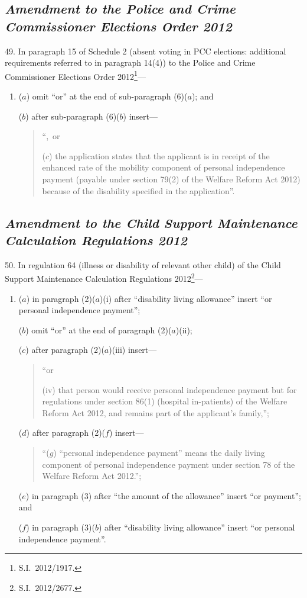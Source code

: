 \documentclass[12pt,a4paper]{article}
\begin{document}
\subsection*{\itshape Amendment to the Police and Crime Commissioner Elections Order 2012}

49.  In paragraph 15 of Schedule 2 (absent voting in PCC elections: additional requirements referred to in paragraph 14(4)) to the Police and Crime Commissioner Elections Order 2012\footnote{S.I.~2012/1917.}—
\begin{enumerate}\item[]
($a$) omit “or” at the end of sub-paragraph (6)($a$); and

($b$) after sub-paragraph (6)($b$)  insert—
\begin{quotation}
“,~or

($c$) the application states that the applicant is in receipt of the enhanced rate of the mobility component of personal independence payment (payable under section 79(2) of the Welfare Reform Act 2012) because of the disability specified in the application”.
\end{quotation}
\end{enumerate}

\subsection*{\itshape Amendment to the Child Support Maintenance Calculation Regulations 2012}

50.  In regulation 64 (illness or disability of relevant other child) of the Child Support Maintenance Calculation Regulations 2012\footnote{S.I.~2012/2677.}—
\begin{enumerate}\item[]
($a$) in paragraph (2)($a$)(i)  after “disability living allowance” insert “or personal independence payment”;

($b$) omit “or” at the end of paragraph (2)($a$)(ii);

($c$) after paragraph (2)($a$)(iii)  insert—
\begin{quotation}
“or

(iv) that person would receive personal independence payment but for regulations under section 86(1) (hospital in-patients) of the Welfare Reform Act 2012, and remains part of the applicant’s family,”;
\end{quotation}

($d$) after paragraph (2)($f$)  insert—
\begin{quotation}
“($g$) “personal independence payment” means the daily living component of personal independence payment under section 78 of the Welfare Reform Act 2012.”;
\end{quotation}

($e$) in paragraph (3) after “the amount of the allowance” insert “or payment”; and

($f$) in paragraph (3)($b$)  after “disability living allowance” insert “or personal independence payment”.
\end{enumerate}
\end{document}
